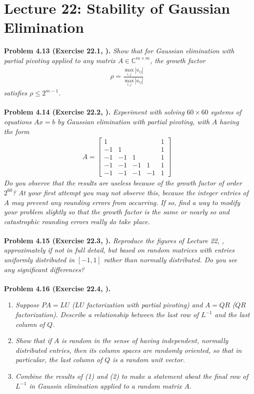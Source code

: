 \documentclass[a4paper,oneside]{book}
\numberwithin{equation}{chapter}
\begin{document}
\section{Lecture 22: Stability of Gaussian Elimination}
\textbf{Problem 4.13 (Exercise 22.1, \cite{1}).} \textit{Show that for Gaussian elimination with partial pivoting applied to any matrix $A\in \mathbb{C}^{m\times m}$, the growth factor}
\begin{align}
\rho  = \frac{{{{\max }_{i,j}}\left| {{u_{ij}}} \right|}}{{{{\max }_{i,j}}\left| {{a_{ij}}} \right|}}
\end{align}
\textit{satisfies $\rho \le 2^{m-1}$.}\\
\\
\textbf{Problem 4.14 (Exercise 22.2, \cite{1}).} \textit{Experiment with solving $60\times 60$ systems of equations $Ax=b$ by Gaussian elimination with partial pivoting, with $A$ having the form}
\begin{align}
A = \left[ {\begin{array}{*{20}{c}}
1&{}&{}&{}&1\\
{ - 1}&1&{}&{}&1\\
{ - 1}&{ - 1}&1&{}&1\\
{ - 1}&{ - 1}&{ - 1}&1&1\\
{ - 1}&{ - 1}&{ - 1}&{ - 1}&1
\end{array}} \right]
\end{align}
\textit{Do you observe that the results are useless because of the growth factor of order $2^{60}$? At your first attempt you may not observe this, because the integer entries of $A$ may prevent any rounding errors from occurring. If so, find a way to modify your problem slightly so that the growth factor is the same or nearly so and catastrophic rounding errors really do take place.}\\
\\
\textbf{Problem 4.15 (Exercise 22.3, \cite{1}).} \textit{Reproduce the figures of Lecture 22, \cite{1}, approximately if not in full detail, but based on random matrices with entries uniformly distributed in $\left[-1,1\right]$ rather than normally distributed. Do you see any significant differences?}\\
\\
\textbf{Problem 4.16 (Exercise 22.4, \cite{1}).}
\begin{enumerate}
\item \textit{Suppose $PA=LU$ ($LU$ factorization with partial pivoting) and $A=QR$ ($QR$ factorization). Describe a relationship between the last row of $L^{-1}$ and the last column of $Q$.}
\item \textit{Show that if $A$ is random in the sense of having independent, normally distributed entries, then its column spaces are randomly oriented, so that in particular, the last column of $Q$ is a random unit vector.}
\item \textit{Combine the results of (1) and (2) to make a statement about the final row of $L^{-1}$ in Gaussin elimination applied to a random matrix $A$.}
\end{enumerate}
\end{document}
